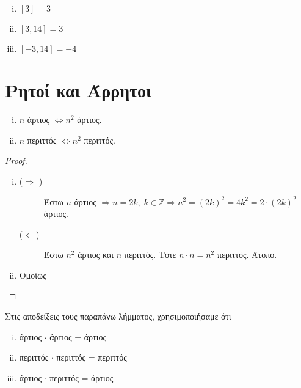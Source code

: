 \documentclass[main.tex]{subfiles}
\begin{document}
\begin{example}
\item {}
  \begin{enumerate}[(i)]
    \item $ [3]=3 $
    \item $ [3,14] = 3  $
    \item $ [-3,14] =-4 $
  \end{enumerate}
\end{example}

\section{Ρητοί και Άρρητοι}

\begin{lem}
\item {}
  \begin{enumerate}[(i)]
    \item $n$ άρτιος $ \Leftrightarrow n^{2} $ άρτιος.
    \item $ n $ περιττός $ \Leftrightarrow n^{2} $ περιττός.
  \end{enumerate}
\end{lem}

\begin{proof}
\item {}
  \begin{enumerate}[(i)]
    \item 
      \begin{description}
        \item [($ \Rightarrow $ )] 
          Έστω $ n $ άρτιος $ \Rightarrow n =2k, \; k \in \mathbb{Z} 
          \Rightarrow n^{2} = (2k)^{2} = 4k^{2} = 2\cdot (2k)^{2} $ άρτιος. 
        \item [($ \Leftarrow $)] Έστω $ n^{2} $ άρτιος και $n$ περιττός. Τότε 
          $ n \cdot n = n^{2} $ περιττός. Άτοπο.
      \end{description}

    \item Ομοίως
  \end{enumerate}
\end{proof}

\begin{rem}
  Στις αποδείξεις τους παραπάνω λήμματος, χρησιμοποιήσαμε ότι 
  \begin{enumerate}[(i)]
    \item άρτιος $ \cdot $ άρτιος = άρτιος
    \item περιττός $ \cdot $ περιττός = περιττός
    \item άρτιος $ \cdot $ περιττός = άρτιος
  \end{enumerate}
\end{rem}
\end{document}

